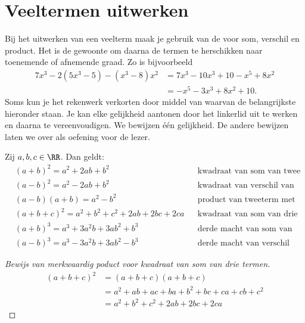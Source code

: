 \documentclass{ximera}
\begin{document}
\section{Veeltermen uitwerken}

Bij het uitwerken van een veelterm maak je gebruik van de  voor som, verschil en product. Het is de gewoonte om daarna de termen te herschikken naar toenemende of afnemende graad. Zo is bijvoorbeeld
\begin{align*}
7x^3-2(5x^3-5)-(x^3-8)x^2 & = 7x^3 - 10x^3 + 10 - x^5 + 8x^2 \\
& = -x^5 - 3x^3 + 8x^2 + 10.
\end{align*}
Soms kun je het rekenwerk verkorten door middel van 
waarvan de belangrijkste hieronder staan. Je kan elke gelijkheid aantonen door het linkerlid uit te werken en daarna te vereenvoudigen. We bewijzen \'e\'en gelijkheid. De andere bewijzen laten we over als oefening voor de lezer. 

\begin{eigenschap}
Zij $a,b,c \in \RR$. Dan geldt:
\begin{align*}
& (a+b)^2 = a^2+2ab+b^2 && \text{kwadraat van som van twee termen} \\
& (a-b)^2 = a^2-2ab+b^2 && \text{kwadraat van verschil van twee termen} \\
& (a-b)(a+b) = a^2-b^2 && \text{product van tweeterm met zijn toegevoegde} \\
& (a+b+c)^2 = a^2 + b^2 + c^2 + 2ab + 2bc + 2ca && \text{kwadraat van som van drie termen} \\
& (a+b)^3 = a^3+3a^2b+3ab^2+b^3 && \text{derde macht van som van twee termen} \\
& (a-b)^3 = a^3-3a^2b+3ab^2-b^3 && \text{derde macht van verschil van twee termen.}
\end{align*}
\end{eigenschap} 
\begin{proof}[Bewijs van merkwaardig poduct voor kwadraat van som van drie termen]
\begin{align}
(a+b+c)^2 
& = (a+b+c)(a+b+c) \nonumber \\
& = a^2 + ab + ac + ba + b^2 + bc + ca + cb + c^2 \nonumber \\
& = a^2 + b^2 + c^2 + 2ab + 2bc + 2ca \tag*{\qedhere}
\end{align}
\end{proof}
\end{document}
